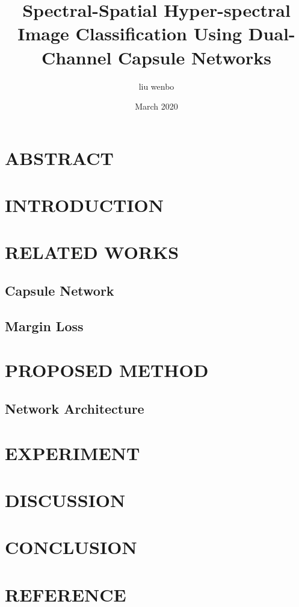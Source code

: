 \documentclass{article}
\title{Spectral-Spatial Hyper-spectral Image Classification Using Dual-Channel Capsule Networks}
\author{liu wenbo}
\date{March 2020}
\begin{document}
\maketitle
\section{ABSTRACT}
\section{INTRODUCTION}
\section{RELATED WORKS}
\subsection{Capsule Network}
\subsection{Margin Loss}
\section{PROPOSED METHOD}
\subsection{Network Architecture}
\section{EXPERIMENT}
\section{DISCUSSION}
\section{CONCLUSION}
\section{REFERENCE}
\end{document}
